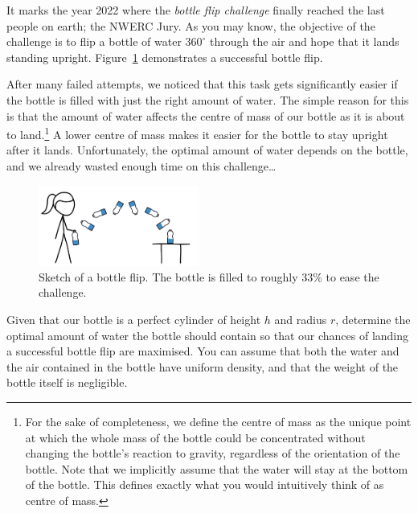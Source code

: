 
\newcommand{\maxd}{1000}

It marks the year 2022 where the \emph{bottle flip challenge} finally reached the last people on earth; the NWERC Jury.
As you may know, the objective of the challenge is to flip a bottle of water $360^{\circ}$ through the air and hope that it lands standing upright.
Figure~\ref{fig:flip} demonstrates a successful bottle flip.

After many failed attempts, we noticed that this task gets significantly easier if the bottle is filled with just the right amount of water.
The simple reason for this is that the amount of water affects the centre of mass of our bottle as it is about to land.\footnote{
    For the sake of completeness, we define the centre of mass as
    the unique point at which the whole mass of the bottle could be concentrated
    without changing the bottle's reaction to gravity,
    regardless of the orientation of the bottle.
    Note that we implicitly assume that the water will stay at the bottom of the bottle.
    This defines exactly what you would intuitively think of as centre of mass.
}
A lower centre of mass makes it easier for the bottle to stay upright after it lands.
Unfortunately, the optimal amount of water depends on the bottle, and we already wasted enough time on this challenge\dots

\begin{figure}[!h]
	\centering
	\includegraphics[width=0.47\textwidth]{sketch}
	\caption{Sketch of a bottle flip.
		The bottle is filled to roughly $33\%$ to ease the challenge.}
	\label{fig:flip}
\end{figure}

Given that our bottle is a perfect cylinder of height $h$ and radius $r$,
determine the optimal amount of water the bottle should contain so that our
chances of landing a successful bottle flip are maximised.
You can assume that
both the water and the air contained in the bottle have uniform density, and
that the weight of the bottle itself is negligible.

